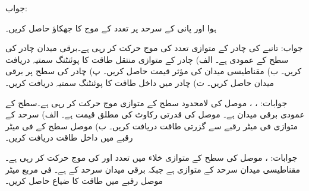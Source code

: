 جواب:

ہوا اور پانی  کے سرحد پر  تعدد کے موج کا جھکاؤ حاصل کریں۔

جواب:
تانبے کی چادر کے متوازی  تعدد کی موج حرکت کر رہی ہے۔برقی میدان  چادر کی سطح کے عمودی  ہے۔ الف) چادر کے متوازی منتقل طاقت کا پوئنٹنگ سمتیہ دریافت کریں۔ ب) مقناطیسی میدان کی مؤثر قیمت حاصل کریں۔ پ) چادر کی سطح پر برقی میدان حاصل کریں۔ ت) چادر میں داخل طاقت کا پوئنٹنگ سمتیہ دریافت کریں۔

جوابات: ، ،  
موصل کی لامحدود سطح کے متوازی موج حرکت کر رہی ہے۔سطح کے عمودی برقی میدان  ہے۔ موصل کی قدرتی رکاوٹ کی مطلق قیمت  ہے۔ الف) سرحد کے متوازی فی میٹر رقبے سے گزرتی طاقت دریافت کریں۔ ب) موصل سطح کے فی میٹر رقبے میں داخل طاقت دریافت کریں۔

جوابات: ، 
موصل  کی سطح  کے متوازی خلاء میں  تعدد
 اور  کی موج  حرکت کر رہی ہے۔مقناطیسی میدان سرحد کے متوازی ہے جبکہ برقی میدان سرحد کے   ہے۔ فی مربع میٹر موصل رقبے میں طاقت کا ضیاع حاصل کریں۔


